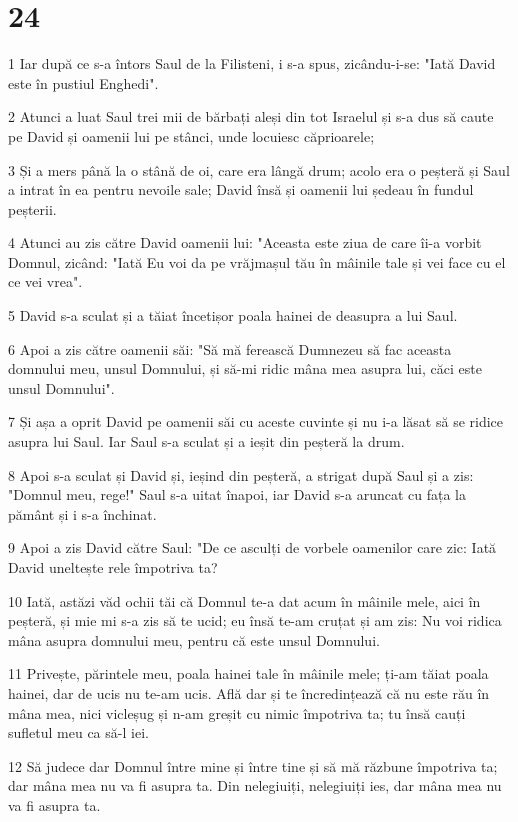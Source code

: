\chapter{24}

\par 1 Iar după ce s-a întors Saul de la Filisteni, i s-a spus, zicându-i-se: "Iată David este în pustiul Enghedi".
\par 2 Atunci a luat Saul trei mii de bărbați aleși din tot Israelul și s-a dus să caute pe David și oamenii lui pe stânci, unde locuiesc căprioarele;
\par 3 Și a mers până la o stână de oi, care era lângă drum; acolo era o peșteră și Saul a intrat în ea pentru nevoile sale; David însă și oamenii lui ședeau în fundul peșterii.
\par 4 Atunci au zis către David oamenii lui: "Aceasta este ziua de care îi-a vorbit Domnul, zicând: "Iată Eu voi da pe vrăjmașul tău în mâinile tale și vei face cu el ce vei vrea".
\par 5 David s-a sculat și a tăiat încetișor poala hainei de deasupra a lui Saul.
\par 6 Apoi a zis către oamenii săi: "Să mă ferească Dumnezeu să fac aceasta domnului meu, unsul Domnului, și să-mi ridic mâna mea asupra lui, căci este unsul Domnului".
\par 7 Și așa a oprit David pe oamenii săi cu aceste cuvinte și nu i-a lăsat să se ridice asupra lui Saul. Iar Saul s-a sculat și a ieșit din peșteră la drum.
\par 8 Apoi s-a sculat și David și, ieșind din peșteră, a strigat după Saul și a zis: "Domnul meu, rege!" Saul s-a uitat înapoi, iar David s-a aruncat cu fața la pământ și i s-a închinat.
\par 9 Apoi a zis David către Saul: "De ce asculți de vorbele oamenilor care zic: Iată David uneltește rele împotriva ta?
\par 10 Iată, astăzi văd ochii tăi că Domnul te-a dat acum în mâinile mele, aici în peșteră, și mie mi s-a zis să te ucid; eu însă te-am cruțat și am zis: Nu voi ridica mâna asupra domnului meu, pentru că este unsul Domnului.
\par 11 Privește, părintele meu, poala hainei tale în mâinile mele; ți-am tăiat poala hainei, dar de ucis nu te-am ucis. Află dar și te încredințează că nu este rău în mâna mea, nici vicleșug și n-am greșit cu nimic împotriva ta; tu însă cauți sufletul meu ca să-l iei.
\par 12 Să judece dar Domnul între mine și între tine și să mă răzbune împotriva ta; dar mâna mea nu va fi asupra ta. Din nelegiuiți, nelegiuiți ies, dar mâna mea nu va fi asupra ta.
